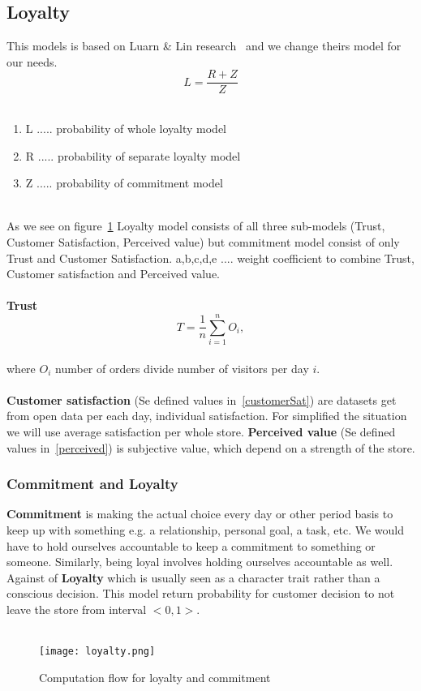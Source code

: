\subsection{Loyalty} \label{subsec:model_loyalty}
This models is based on Luarn \& Lin research~\cite{luarn} and we change theirs model for our needs.\\
\begin{equation} \label{eq:30}
L = \frac{R+Z}{Z}
\end{equation}
\\
\begin{enumerate}
    \item L ..... probability of whole loyalty model
    \item R ..... probability of separate loyalty model
    \item Z ..... probability of commitment model
\end{enumerate}
\\
As we see on figure~\ref{Loyalty scheme} Loyalty model consists of all three sub-models (Trust, Customer Satisfaction, Perceived value)
but commitment model consist of only Trust and Customer Satisfaction.
a,b,c,d,e .... weight coefficient to combine Trust, Customer satisfaction and Perceived value.\\
\\
\textbf{Trust}
\begin{equation} \label{eq:31}
T = \frac{1}{n} \sum_{i=1}^{n} O_i,
\end{equation}
\\
where $O_i$ number of orders divide number of visitors per day $i$.
\\
\\
\textbf{Customer satisfaction} (Se defined values in~\ref{customerSat}) are datasets get from open data per each day, individual satisfaction.
For simplified the situation we will use average satisfaction per whole store.
\textbf{Perceived value} (Se defined values in~\ref{perceived}) is subjective value, which depend on a strength of the store.
\subsubsection{Commitment and Loyalty} \label{subsubsec:model_loyalty_commitment}
\textbf{Commitment} is making the actual choice every day or other period basis to keep up with something e.g. a relationship, personal goal, a task, etc.
We would have to hold ourselves accountable to keep a commitment to something or someone.
Similarly, being loyal involves holding ourselves accountable as well.
Against of \textbf{Loyalty} which is usually seen as a character trait rather than a conscious decision.
This model return probability for customer decision to not leave the store from interval $<0,1>$.\\
\\
\begin{figure}[h!]
    \begin{center}
        \texttt{[image: loyalty.png]}
    \end{center}
    \caption{Computation flow for loyalty and commitment~\cite{luarn}}
    \label{Loyalty scheme}
\end{figure}\\
\newpage
